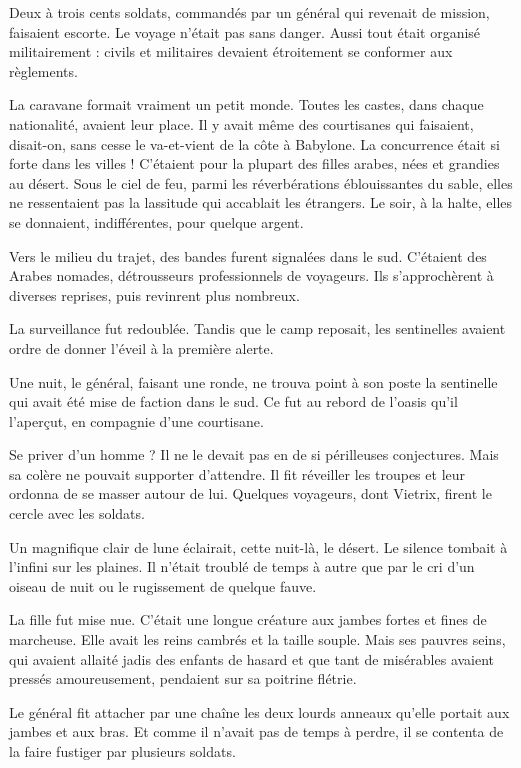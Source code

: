 \documentclass[a4paper, 11pt, oneside, polutonikogreek, french]{article}
\begin{document}
Deux à trois cents soldats, commandés par un général qui revenait de mission, faisaient escorte. Le voyage n'était pas sans danger. Aussi tout était organisé militairement : civils et militaires devaient étroitement se conformer aux règlements.

\bigskip
\centerline{\EightStarTaper}
\centerline{\EightStarTaper\EightStarTaper}
\bigskip

La caravane formait vraiment un petit monde. Toutes les castes, dans chaque nationalité, avaient leur place. Il y avait même des courtisanes qui faisaient, disait-on, sans cesse le va-et-vient de la côte à Babylone. La concurrence était si forte dans les villes ! C'étaient pour la plupart des filles arabes, nées et grandies au désert. Sous le ciel de feu, parmi les réverbérations éblouissantes du sable, elles ne ressentaient pas la lassitude qui accablait les étrangers. Le soir, à la halte, elles se donnaient, indifférentes, pour quelque argent.

Vers le milieu du trajet, des bandes furent signalées dans le sud. C'étaient des Arabes nomades, détrousseurs professionnels de voyageurs. Ils s'approchèrent à diverses reprises, puis revinrent plus nombreux.

La surveillance fut redoublée. Tandis que le camp reposait, les sentinelles avaient ordre de donner l'éveil à la première alerte.

Une nuit, le général, faisant une ronde, ne trouva point à son poste la sentinelle qui avait été mise de faction dans le sud. Ce fut au rebord de l'oasis qu'il l'aperçut, en compagnie d'une courtisane.

Se priver d'un homme ? Il ne le devait pas en de si périlleuses conjectures. Mais sa colère ne pouvait supporter d'attendre. Il fit réveiller les troupes et leur ordonna de se masser autour de lui. Quelques voyageurs, dont Vietrix, firent le cercle avec les soldats.

Un magnifique clair de lune éclairait, cette nuit-là, le désert. Le silence tombait à l'infini sur les plaines. Il n'était troublé de temps à autre que par le cri d'un oiseau de nuit ou le rugissement de quelque fauve.

La fille fut mise nue. C'était une longue créature aux jambes fortes et fines de marcheuse. Elle avait les reins cambrés et la taille souple. Mais ses pauvres seins, qui avaient allaité jadis des enfants de hasard et que tant de misérables avaient pressés amoureusement, pendaient sur sa poitrine flétrie.

Le général fit attacher par une chaîne les deux lourds anneaux qu'elle portait aux jambes et aux bras. Et comme il n'avait pas de temps à perdre, il se contenta de la faire fustiger par plusieurs soldats.
\end{document}
